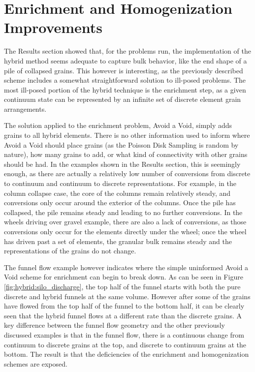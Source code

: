 \newcommand\mystrut{\rule[-0.9cm]{0pt}{2cm}}


\chapter{Enrichment and Homogenization Improvements}
The Results section showed that, for the problems run, the implementation of the hybrid method seems adequate to capture bulk behavior, like the end shape of a pile of collapsed grains. This however is interesting, as the previously described scheme includes a somewhat straightforward solution to ill-posed problems. The most ill-posed portion of the hybrid technique is the enrichment step, as a given continuum state can be represented by an infinite set of discrete element grain arrangements.

The solution applied to the enrichment problem, Avoid a Void, simply adds grains to all hybrid elements. There is no other information used to inform where Avoid a Void should place grains (as the Poisson Disk Sampling is random by nature), how many grains to add, or what kind of connectivity with other grains should be had. In the examples shown in the Results section, this is seemingly enough, as there are actually a relatively low number of conversions from discrete to continuum and continuum to discrete representations. For example, in the column collapse case, the core of the columns remain relatively steady, and conversions only occur around the exterior of the columns. Once the pile has collapsed, the pile remains steady and leading to no further conversions. In the wheels driving over gravel example, there are also a lack of conversions, as those conversions only occur for the elements directly under the wheel; once the wheel has driven past a set of elements, the granular bulk remains steady and the representations of the grains do not change.

The funnel flow example however indicates where the simple uninformed Avoid a Void scheme for enrichment can begin to break down. As can be seen in Figure \ref{fig:hybrid:silo_discharge}, the top half of the funnel starts with both the pure discrete and hybrid funnels at the same volume. However after some of the grains have flowed from the top half of the funnel to the bottom half, it can be clearly seen that the hybrid funnel flows at a different rate than the discrete grains. A key difference between the funnel flow geometry and the other previously discussed examples is that in the funnel flow, there is a continuous change from continuum to discrete grains at the top, and discrete to continuum grains at the bottom. The result is that the deficiencies of the enrichment and homogenization schemes are exposed. 

